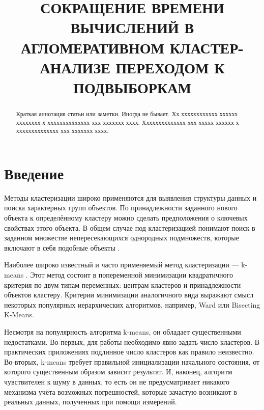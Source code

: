 \documentclass[12pt]{a&t}
\begin{document}

\title{СОКРАЩЕНИЕ ВРЕМЕНИ ВЫЧИСЛЕНИЙ В АГЛОМЕРАТИВНОМ КЛАСТЕР-АНАЛИЗЕ ПЕРЕХОДОМ К ПОДВЫБОРКАМ}


\maketitle

\begin{abstract}
Краткая аннотация статьи или заметки. Иногда не бывает. Хх
хххххххххххх хххххх хххххххх х хххххххххххххх ххх ххххххх хххх.
Хххххххххххххх ххх ххххх хххххх х хххххххххххххх ххх ххххххх
хххх.
\end{abstract}


\section{Введение}

Методы кластеризации широко применяются для выявления структуры данных и поиска характерных групп объектов. По принадлежности заданного нового объекта к определённому кластеру можно сделать предположения о ключевых свойствах этого объекта. В общем случае под кластеризацией понимают  поиск в заданном множестве  непересекающихся однородных подмножеств, которые включают в себя подобные объекты \cite{Mirkin-Vvedenie-v-analiz-dannyh}.
 
Наиболее широко известный и часто применяемый метод кластеризации --- \mbox{k-means} \cite{K-Means-canonical}. Этот метод состоит в попеременной минимизации квадратичного критерия по двум типам переменных: центрам кластеров и принадлежности объектов кластеру. Критерии минимизации аналогичного вида выражают смысл некоторых популярных иерархических алгоритмов, например, Ward \cite{Ward-canonical} или Bisecting \mbox{K-Means}\cite{Mirkin-Clustering-A-Data-Recovery-Approach}.

Несмотря на популярность алгоритма \mbox{k-means}, он обладает существенными недостатками. Во-первых, для работы необходимо явно задать число кластеров. В практических приложениях подлинное число кластеров как правило неизвестно. Во-вторых, \mbox{k-means} требует правильной инициализации начального состояния, от которого существенным образом зависит результат. И, наконец, алгоритм чувствителен к шуму в данных, то есть он не предусматривает никакого механизма учёта возможных погрешностей, которые зачастую возникают в реальных данных, полученных при помощи измерений.
\end{document}
